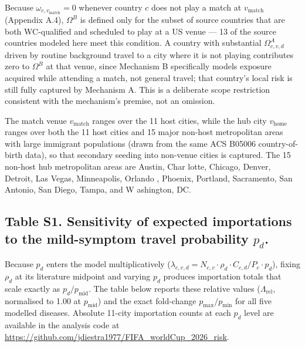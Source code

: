 \documentclass[12pt, a4paper]{article}
\begin{document}
Because $\omega_{c,v_{\text{match}}} = 0$ whenever country $c$ does
not play a match at $v_{\text{match}}$ (Appendix A.4), $\Omega^B$ is
defined only for the subset of source countries that are both
WC-qualified and scheduled to play at a US venue --- 13 of the
source countries modeled here meet this condition. A country with
substantial $\Omega^A_{c,v,d}$ driven by routine background travel
to a city where it is not playing contributes zero to $\Omega^B$ at
that venue, since Mechanism B specifically models exposure acquired
while attending a match, not general travel; that country's local
risk is still fully captured by Mechanism A. This is a deliberate
scope restriction consistent with the mechanism's premise, not an
omission.

The match venue $v_{\text{match}}$ ranges over the 11 host cities, while the hub city $v_{\text{home}}$ ranges over both the 11 host cities and 15 major non-host metropolitan areas with large immigrant populations (drawn from the same ACS B05006 country-of-birth data), so that secondary seeding into non-venue cities
is captured. The 15
non-host hub metropolitan areas are Austin, Char
lotte, Chicago,
Denver, Detroit, Las Vegas, Minneapolis, Orlando
, Phoenix, Portland,
Sacramento, San Antonio, San Diego, Tampa, and W
ashington, DC.
\newpage

\subsection*{Table S1. Sensitivity of expected importations to the mild-symptom travel probability $p_d$.}

Because $p_d$ enters the model multiplicatively
($\lambda_{c,v,d} = N_{c,v}\cdot\rho_d\cdot C_{c,d}/P_c\cdot p_d$),
fixing $\rho_d$ at its literature midpoint and varying $p_d$ produces
importation totals that scale exactly as $p_d/p_{\text{mid}}$. The
table below reports these relative values ($\Lambda_{\text{rel}}$,
normalised to 1.00 at $p_{\text{mid}}$) and the exact fold-change
$p_{\max}/p_{\min}$ for all five modelled diseases. Absolute 11-city
importation counts at each $p_d$ level are available in the
analysis code at \url{https://github.com/jdiestra1977/FIFA\_worldCup\_2026\_risk}.
\end{document}
